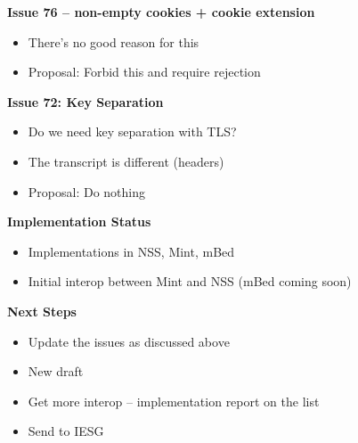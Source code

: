 \documentclass[helvetica]{seminar}
\newcommand{\heading}[1]{%
  \begin{center} 
    \large\bf 
    #1 
  \end{center} 
  \vspace{.4 in}}
\begin{document}
\begin{slide}
  \heading{Issue 76 -- non-empty cookies + cookie extension}

  \begin{itemize}
  \item There's no good reason for this
  \item Proposal: Forbid this and require rejection
  \end{itemize}
\end{slide}


\begin{slide}
  \heading{Issue 72: Key Separation}

  \begin{itemize}
  \item Do we need key separation with TLS?
  \item The transcript is different (headers)
  \item Proposal: Do nothing
  \end{itemize}
\end{slide}

\begin{slide}
  \heading{Implementation Status}

  \begin{itemize}
  \item Implementations in NSS, Mint, mBed
  \item Initial interop between Mint and NSS (mBed coming soon)
  \end{itemize}
\end{slide}

\begin{slide}
\heading{Next Steps}

\begin{itemize}
\item Update the issues as discussed above
\item New draft
\item Get more interop -- implementation report on the list
\item Send to IESG
\end{itemize}
\end{slide}
\end{document}
